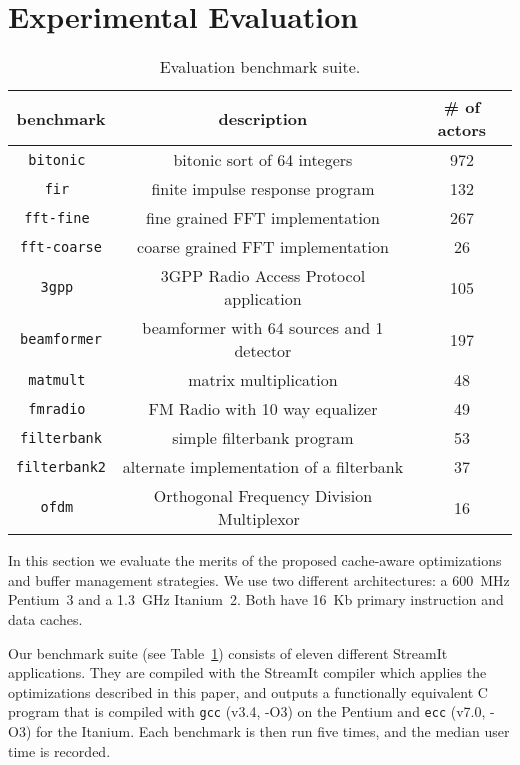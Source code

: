 \section{Experimental Evaluation}
\label{sec:evaluation}

\begin{table}[t]
\center
\label{tab:benchmarks}
\vspace{-12pt}
{\tiny
\begin{tabular}{|c|c|c|} \hline
{\bf benchmark}&{\bf description}&{\bf \# of actors}\\ \hline \hline
\texttt{bitonic	} &bitonic sort of 64 integers	&	972 \\ \hline
\texttt{fir	      } &finite impulse response program	&	132 \\ \hline
\texttt{fft-fine	} &fine grained FFT implementation	&	267 \\ \hline
\texttt{fft-coarse} &coarse grained FFT implementation	&	26 \\ \hline
\texttt{3gpp	} &3GPP Radio Access Protocol application	&	105 \\ \hline
\texttt{beamformer} &beamformer with 64 sources and 1 detector& 197 \\ \hline
\texttt{matmult	} &matrix multiplication	&	48 \\ \hline
\texttt{fmradio	} &FM Radio with 10 way equalizer	&	49 \\ \hline
\texttt{filterbank} &simple filterbank program	&	53 \\ \hline
\texttt{filterbank2}&alternate implementation of a filterbank &	37 \\ \hline
\texttt{ofdm	 }& Orthogonal Frequency Division Multiplexor~\cite{spectrumware}	&	16 \\ \hline
\end{tabular}
}
\vspace{-12pt}
\caption{Evaluation benchmark suite.}
\end{table}


In this section we evaluate the merits of the proposed cache-aware
optimizations and buffer management strategies. We use two
different architectures: a 600~MHz Pentium~3 and a 1.3~GHz
Itanium~2. Both have 16~Kb primary instruction and data caches.

Our benchmark suite (see Table~\ref{tab:benchmarks}) consists of eleven
different StreamIt applications. They are compiled with the StreamIt
compiler which applies the optimizations described in this paper, and
outputs a functionally equivalent C program that is compiled with
\texttt{gcc} (v3.4, -O3) on the Pentium and \texttt{ecc} 
(v7.0, -O3) for the Itanium. Each benchmark is
then run five times, and the median user time is recorded.

